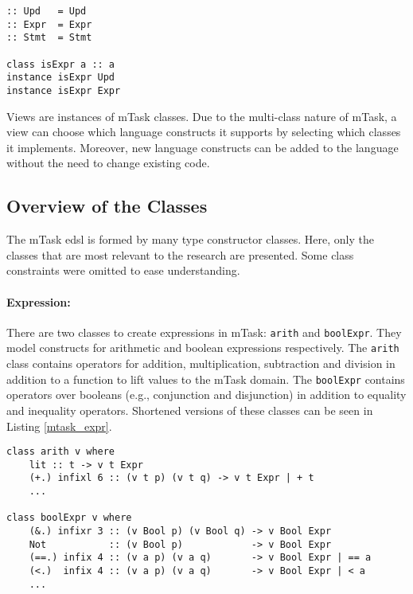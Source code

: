 \begin{lstlisting}[caption=\gls{mTask} construction roles, captionpos=b,label=mtask_roles]
:: Upd   = Upd
:: Expr  = Expr
:: Stmt  = Stmt

class isExpr a :: a
instance isExpr Upd
instance isExpr Expr
\end{lstlisting}

Views are instances of \gls{mTask} classes. Due to the multi-class nature of \gls{mTask}, a view can choose which language constructs it supports by selecting which classes it implements. Moreover, new language constructs can be added to the language without the need to change existing code. 


\subsection{Overview of the Classes}\label{sec:mtask_classes}

The \gls{mTask} \ac{edsl} is formed by many type constructor classes. Here, only the classes that are most relevant to the research are presented. Some class constraints were omitted to ease understanding.

\paragraph{Expression:} There are two classes to create expressions in \gls{mTask}: \texttt{arith} and \texttt{boolExpr}. They model constructs for arithmetic and boolean expressions respectively. The \texttt{arith} class contains operators for addition, multiplication, subtraction and division in addition to a function to lift values to the \gls{mTask} domain. The \texttt{boolExpr} contains operators over booleans (e.g., conjunction and disjunction) in addition to equality and inequality operators. Shortened versions of these classes can be seen in Listing \ref{mtask_expr}. 

\begin{lstlisting}[caption=\gls{mTask} expression classes,captionpos=b,label=mtask_expr]
class arith v where
	lit :: t -> v t Expr 
	(+.) infixl 6 :: (v t p) (v t q) -> v t Expr | + t
	...

class boolExpr v where
	(&.) infixr 3 :: (v Bool p) (v Bool q) -> v Bool Expr 
	Not           :: (v Bool p)            -> v Bool Expr 
	(==.) infix 4 :: (v a p) (v a q)       -> v Bool Expr | == a
	(<.)  infix 4 :: (v a p) (v a q)       -> v Bool Expr | < a
	...
\end{lstlisting}

